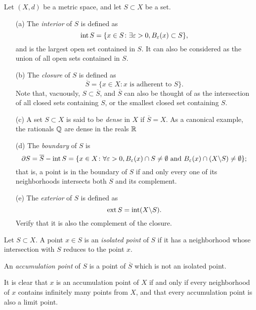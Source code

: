 \begin{definition}
	Let $(X,d)$ be a metric space, and let $S \subset X$ be a set.
	\begin{enumerate}
		\item[(a)] The \emph{interior} of $S$ is defined as $$\operatorname{int} S=\{x \in S \colon \exists \varepsilon>0, B_{\varepsilon}(x) \subset S\},$$ and is the largest open set contained in $S$. It can also be considered as the union of all open sets contained in $S$.
		\item[(b)] The \emph{closure} of $S$ is defined as $$\overline{S}=\{x \in X \colon x \text{ is adherent to } S\}.$$ Note that, vacuously, $S \subset \overline{S}$, and $\overline{S}$ can also be thought of as the intersection of all closed sets containing $S$, or the smallest closed set containing $S$.
		\item[(c)] A set $S \subset X$ is said to be \emph{dense} in $X$ if $\overline{S}=X$. As a canonical example, the rationals $\mathbb Q$ are dense in the reals $\mathbb R$
		\item[(d)] The \emph{boundary} of $S$ is $$\partial S=\overline{S}-\operatorname{int} S=\{x \in X \colon \forall \varepsilon>0, B_{\varepsilon}(x) \cap S \neq \emptyset \text{ and } B_{\varepsilon}(x) \cap (X \backslash S) \neq \emptyset\};$$ that is, a point is in the boundary of $S$ if and only every one of its neighborhoods intersects both $S$ and  its complement.
		\item[(e)] The \emph{exterior} of $S$ is defined as $$\operatorname{ext} S=\operatorname{int}(X \backslash S).$$ Verify that it is also the complement of the closure.
	\end{enumerate}
\end{definition}

\begin{definition}
	Let $S \subset X$. A point $x \in S$ is an \emph{isolated point} of $S$ if it has a neighborhood whose intersection with $S$ reduces to the point $x$.
	
	An \emph{accumulation point} of $S$ is a point of $\overline{S}$ which is not an isolated point.
\end{definition}

It is clear that $x$ is an accumulation point of $X$ if and only if every neighborhood of $x$ contains infinitely many points from $X$, and that every accumulation point is also a limit point.

